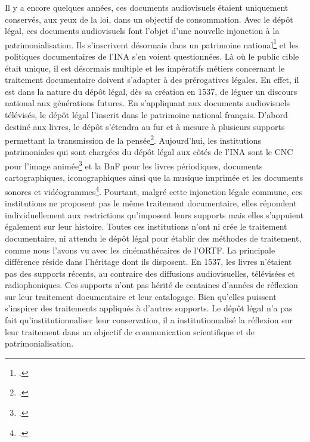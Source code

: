 Il y a encore quelques années, ces documents audiovisuels étaient uniquement conservés, aux yeux de la loi, dans un objectif de consommation. Avec le dépôt légal, ces documents audiovisuels font l’objet d’une nouvelle injonction à la patrimonialisation. Ils s’inscrivent désormais dans un patrimoine national\footcite[][74]{bermès2024} et les politiques documentaires de l’INA s’en voient questionnées. Là où le public cible était unique, il est désormais multiple et les impératifs métiers concernant le traitement documentaire doivent s’adapter à des prérogatives légales. En effet, il est dans la nature du dépôt légal, dès sa création en 1537, de léguer un discours national aux générations futures. En s'appliquant aux documents audiovisuels télévisés, le dépôt légal l'inscrit dans le patrimoine national français. D’abord destiné aux livres, le dépôt s’étendra au fur et à mesure à plusieurs supports permettant la transmission de la pensée\footcite[][18-19]{saby2013}. Aujourd’hui, les institutions patrimoniales qui sont chargées du dépôt légal aux côtés de l’INA sont le CNC pour l’image animée\footcite[]{zotero-item-673} et la BnF pour les livres périodiques, documents cartographiques, iconographiques ainsi que la musique imprimée et les documents sonores et vidéogrammes\footcite[]{zotero-item-675}. Pourtant, malgré cette injonction légale commune, ces institutions ne proposent pas le même traitement documentaire, elles répondent individuellement aux restrictions qu’imposent leurs supports mais elles s’appuient également sur leur histoire. Toutes ces institutions n’ont ni crée le traitement documentaire, ni attendu le dépôt légal pour établir des méthodes de traitement, comme nous l’avons vu avec les cinémathécaires de l’ORTF. La principale différence réside dans l’héritage dont ils disposent. En 1537, les livres n’étaient pas des supports récents, au contraire des diffusions audiovisuelles, télévisées et radiophoniques. Ces supports n’ont pas hérité de centaines d’années de réflexion sur leur traitement documentaire et leur catalogage. Bien qu'elles puissent s'inspirer des traitements appliqués à d'autres supports. Le dépôt légal n’a pas fait qu’institutionnaliser leur conservation, il a institutionnalisé la réflexion sur leur traitement dans un objectif de communication scientifique et de patrimonialisation. 


